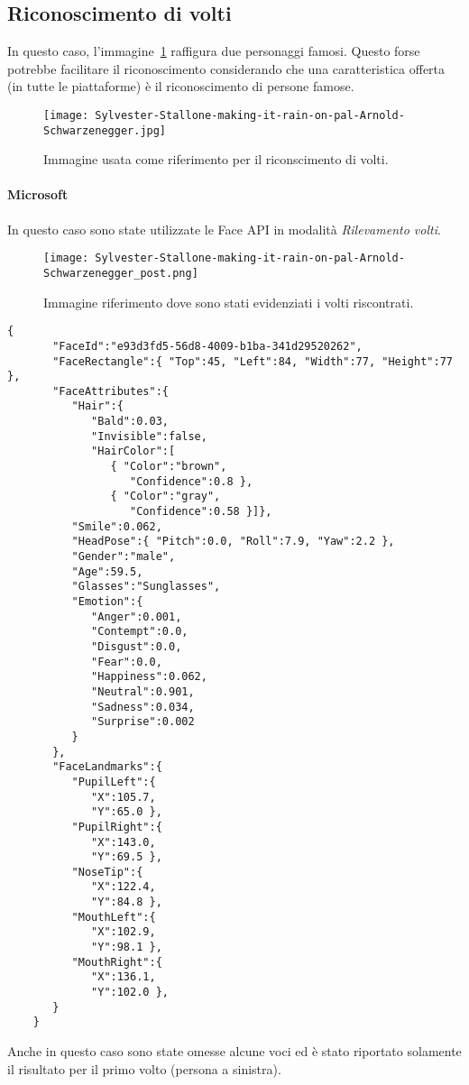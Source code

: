 \subsection{Riconoscimento di volti}\label{subsec:riconscimento-volti}
In questo caso, l'immagine~\ref{fig:stallone} raffigura due personaggi famosi. Questo forse potrebbe facilitare il riconoscimento
considerando che una caratteristica offerta (in tutte le piattaforme) è il riconoscimento di persone famose.
%
\begin{figure}[!h]
\begin{center}
	\texttt{[image: Sylvester-Stallone-making-it-rain-on-pal-Arnold-Schwarzenegger.jpg]}
{\scriptsize \caption{Immagine usata come riferimento per il riconscimento di volti.}
\label{fig:stallone}}
\end{center}
\end{figure}
%
\paragraph{Microsoft}In questo caso sono state utilizzate le Face API in modalità \textit{Rilevamento volti}.
\begin{figure}[!h]
\begin{center}
	\texttt{[image: Sylvester-Stallone-making-it-rain-on-pal-Arnold-Schwarzenegger\_post.png]}
{\scriptsize \caption{Immagine riferimento dove sono stati evidenziati i volti riscontrati.}
\label{fig:stallone-post}}
\end{center}
\end{figure}
\begin{lstlisting}[style=myJSON, caption=Risultato dell'interrogazione con le Face API., label=lst:risultati-microsoft-volti]
	{
	   "FaceId":"e93d3fd5-56d8-4009-b1ba-341d29520262",
	   "FaceRectangle":{ "Top":45, "Left":84, "Width":77, "Height":77 },
	   "FaceAttributes":{
	      "Hair":{
	         "Bald":0.03,
	         "Invisible":false,
	         "HairColor":[
	            { "Color":"brown",
	               "Confidence":0.8 },
	            { "Color":"gray",
	               "Confidence":0.58 }]},
	      "Smile":0.062,
	      "HeadPose":{ "Pitch":0.0, "Roll":7.9, "Yaw":2.2 },
	      "Gender":"male",
	      "Age":59.5,
	      "Glasses":"Sunglasses",
	      "Emotion":{
	         "Anger":0.001,
	         "Contempt":0.0,
	         "Disgust":0.0,
	         "Fear":0.0,
	         "Happiness":0.062,
	         "Neutral":0.901,
	         "Sadness":0.034,
	         "Surprise":0.002
	      }
	   },
	   "FaceLandmarks":{
	      "PupilLeft":{
	         "X":105.7,
	         "Y":65.0 },
	      "PupilRight":{
	         "X":143.0,
	         "Y":69.5 },
	      "NoseTip":{
	         "X":122.4,
	         "Y":84.8 },
	      "MouthLeft":{
	         "X":102.9,
	         "Y":98.1 },
	      "MouthRight":{
	         "X":136.1,
	         "Y":102.0 },
	   }
	}
\end{lstlisting}
%
Anche in questo caso sono state omesse alcune voci ed è stato riportato solamente il risultato per il primo volto (persona a sinistra).

